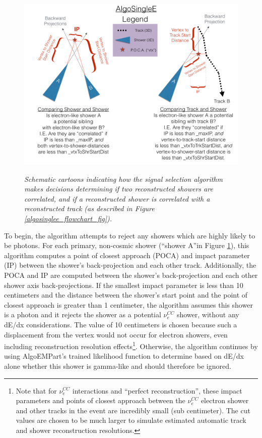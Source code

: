 \begin{figure}[ht!]
\centering
\includegraphics[width=150mm]{Figures/algosinglee_cartoon.png}\\
\caption{\textit{Schematic cartoons indicating how the signal selection algorithm makes decisions determining if two reconstructed showers are correlated, and if a reconstructed shower is correlated with a reconstructed track (as described in Figure \ref{algosinglee_flowchart_fig}).}}
\label{algosinglee_cartoon_fig}
\end{figure}

To begin, the algorithm attempts to reject any showers which are highly likely to be photons. For each primary, non-cosmic shower (``shower A''in Figure \ref{algosinglee_cartoon_fig}), this algorithm computes a point of closest approach (POCA) and impact parameter (IP) between the shower's back-projection and each other track. Additionally, the POCA and IP are computed between the shower's back-projection and each other shower axis back-projections. If the smallest impact parameter is less than 10 centimeters and the distance between the shower's start point and the point of closest approach is greater than 1 centimeter, the algorithm assumes this shower is a photon and it rejects the shower as a potential $\nu_e^{CC}$ shower, without any dE/dx considerations. The value of 10 centimeters is chosen because such a displacement from the vertex would not occur for electron showers, even including reconstruction resolution effects\footnote{Note that for $\nu_e^{CC}$ interactions and ``perfect reconstruction'', these impact parameters and points of closest approach between the $\nu_e^{CC}$ electron shower and other tracks in the event are incredibly small (sub centimeter). The cut values are chosen to be much larger to simulate estimated automatic track and shower reconstruction resolutions.}. Otherwise, the algorithm continues by using AlgoEMPart's trained likelihood function to determine based on dE/dx alone whether this shower is gamma-like and should therefore be ignored.\\

